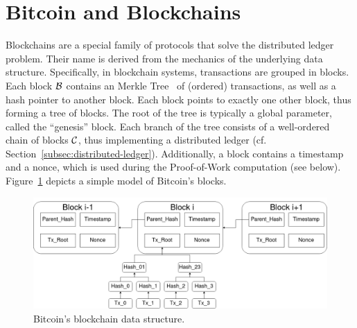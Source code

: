\section{Bitcoin and Blockchains}\label{sec:bitcoin-preliminaries}

Blockchains are a special family of protocols that solve the distributed ledger
problem. Their name is derived from the mechanics of the underlying data
structure. Specifically, in blockchain systems, transactions are grouped in
blocks. Each block $\mathcal{B}$ contains an Merkle Tree~\cite{C:Merkle87} of
(ordered) transactions, as well as a hash pointer to another block. Each block
points to exactly one other block, thus forming a tree of blocks. The root of
the tree is typically a global parameter, called the ``genesis'' block. Each
branch of the tree consists of a well-ordered chain of blocks $\mathcal{C}$, thus
implementing a distributed ledger (cf.
Section~\ref{subsec:distributed-ledger}). Additionally, a block contains a
timestamp and a nonce, which is used during the Proof-of-Work computation (see
below). Figure~\ref{fig:blockchain} depicts a simple model of Bitcoin's blocks.

\begin{figure}[h!]
	\centering
	\includegraphics[width=1\columnwidth,keepaspectratio]{figures/blockchain.png}
	\caption{Bitcoin's blockchain data structure.}
	\label{fig:blockchain}
\end{figure}

